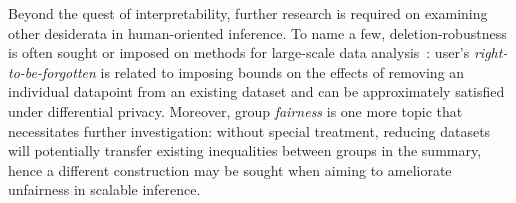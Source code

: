 Beyond the quest of interpretability, further research is required on examining other desiderata in human-oriented inference. To name a few, deletion-robustness is often sought or imposed on methods for large-scale data analysis~\citep{mirzasoleiman17, ginart19}: user's \emph{right-to-be-forgotten} is related to imposing bounds on the effects of removing an individual datapoint from an existing dataset and can be approximately satisfied under differential privacy. Moreover, group \emph{fairness} is one more topic that necessitates further investigation: without special treatment, reducing datasets will potentially transfer existing inequalities between groups in the summary, hence a different construction may be sought when aiming to ameliorate unfairness in scalable inference.  